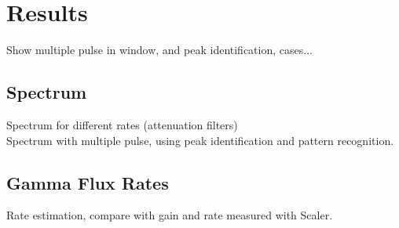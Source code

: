 \section{Results}
Show multiple pulse in window, and peak identification, cases...
\subsection{Spectrum}
Spectrum for different rates (attenuation filters)\\
Spectrum with multiple pulse, using peak identification and pattern recognition.\\
\subsection{Gamma Flux Rates}
Rate estimation, compare with gain and rate measured with Scaler.




